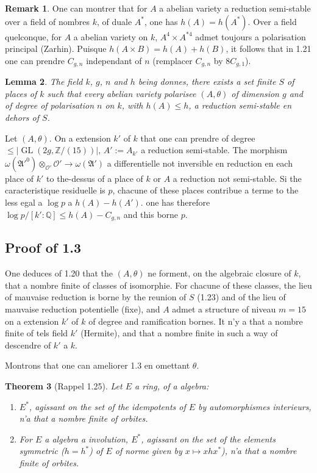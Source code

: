 \documentclass[12pt,a4paper]{article}
\theoremstyle{plain}
\newtheorem{theorem}{Theorem}[section]
\newtheorem{lemma}[theorem]{Lemma}
\theoremstyle{definition}
\newtheorem{remark}[theorem]{Remark}
\theoremstyle{remark}
\DeclareMathOperator{\GL}{GL}
\newcommand{\QQ}{\mathbb{Q}}
\newcommand{\ZZ}{\mathbb{Z}}
\newcommand{\cO}{\mathcal{O}}
\newcommand{\fA}{\mathfrak{A}}
\providecommand{\QQ}{\mathbb{Q}}
\providecommand{\ZZ}{\mathbb{Z}}
\providecommand{\cO}{\mathcal{O}}
\providecommand{\fA}{\mathfrak{A}}
\providecommand{\GL}{\operatorname{GL}}
\begin{document}
\begin{remark}
One can montrer that for $A$ a abelian variety a reduction semi-stable over a field of nombres $k$, of duale $A^*$, one has $h(A) = h(A^*)$. Over a field quelconque, for $A$ a abelian variety on $k$, $A^4 \times A^{*4}$ admet toujours a polarisation principal (Zarhin). Puisque $h(A \times B) = h(A) + h(B)$, it follows that in 1.21 one can prendre $C_{g,n}$ independant of $n$ (remplacer $C_{g,n}$ by $8C_{g,1}$).
\end{remark}

\begin{lemma}
The field $k$, $g$, $n$ and $h$ being donnes, there exists a set finite $S$ of places of $k$ such that every abelian variety polarisee $(A,\theta)$ of dimension $g$ and of degree of polarisation $n$ on $k$, with $h(A) \leq h$, a reduction semi-stable en dehors of $S$.
\end{lemma}

Let $(A,\theta)$. On a extension $k'$ of $k$ that one can prendre of degree $\leq |\GL(2g, \ZZ/(15))|$, $A' := A_{k'}$ a reduction semi-stable. The morphism $\omega(\fA'^0) \otimes_{\cO'} \cO' \to \omega(\fA')$ a differentielle not inversible en reduction en each place of $k'$ to the-dessus of a place of $k$ or $A$ a reduction not semi-stable. Si the caracteristique residuelle is $p$, chacune of these places contribue a terme to the less egal a $\log p$ a $h(A) - h(A')$. one has therefore $\log p/[k':\QQ] \leq h(A) - C_{g,n}$ and this borne $p$.

\subsection{Proof of 1.3}

One deduces of 1.20 that the $(A,\theta)$ ne forment, on the algebraic closure of $k$, that a nombre finite of classes of isomorphie. For chacune of these classes, the lieu of mauvaise reduction is borne by the reunion of $S$ (1.23) and of the lieu of mauvaise reduction potentielle (fixe), and $A$ admet a structure of niveau $m = 15$ on a extension $k'$ of $k$ of degree and ramification bornes. It n'y a that a nombre finite of tels field $k'$ (Hermite), and that a nombre finite in such a way of descendre of $k'$ a $k$.

Montrons that one can ameliorer 1.3 en omettant $\theta$.

\begin{theorem}[Rappel 1.25]
Let $E$ a ring, of a algebra:
\begin{enumerate}[label=(\roman*)]
\item $E^*$, agissant on the set of the idempotents of $E$ by automorphismes interieurs, n'a that a nombre finite of orbites.
\item For $E$ a algebra a involution, $E^*$, agissant on the set of the elements symmetric ($h = h^*$) of $E$ of norme given by $x \mapsto xhx^*$), n'a that a nombre finite of orbites.
\end{enumerate}
\end{theorem}
\end{document}
